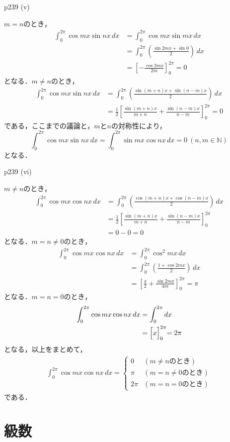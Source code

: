 \documentclass[dvipdfmx,uplatex,11pt]{jsarticle}
\theoremstyle{definition}
\begin{document}
	\begin{screen}
		p239 (v) \par 
		$m=n$のとき，
		\begin{align*}
			\int_{0}^{2\pi} \cos m x \sin nx \, dx & = \int_{0}^{2\pi} \cos mx \sin mx \, dx \\
			& = \int_{0}^{2\pi} \left (\frac{\sin 2mx + \sin 0}{2}\right ) \, dx \\
			& = \left [-\frac{\cos 2mx}{2m}\right ]_{0}^{2\pi} =0
		\end{align*}
		となる．$m \ne n$のとき，
		\begin{align*}
			\int_{0}^{2\pi} \cos mx \sin nx \, dx & = \int_{0}^{2\pi} \left (\frac{\sin (m+n)x + \sin (n-m)x}{2}\right) \, dx \\
			& = \frac{1}{2}\left [\frac{\sin (m+n)x}{m+n}+\frac{\sin (n-m)x}{n-m} \right]_{0}^{2\pi} =0
		\end{align*}
		である，ここまでの議論と，$m$と$n$の対称性により，
			\[
				\int_{0}^{2\pi} \cos mx \sin nx \, dx =\int_{0}^{2\pi} \sin mx \cos nx \, dx =0 ~(n,m \in \mathbb{N})
			\]
		となる．
	\end{screen}

	\begin{screen}
		p239 (vi) \par 
		$m \ne n$のとき，
		\begin{align*}
			\int_{0}^{2\pi} \cos mx \cos nx \, dx & = \int_{0}^{2\pi} \left (\frac{\cos(m+n)x+\cos(n-m)x}{2}\right) \, dx\\
			& = \frac{1}{2} \left [\frac{\sin (m+n)x}{m+n}+\frac{\sin(n-m)x}{n-m}\right]_{0}^{2\pi} \\
			& = 0-0 =0
		\end{align*}
		となる．$m =n \ne 0$のとき，
		\begin{align*}
			\int_{0}^{2\pi} \cos mx \cos nx \, dx & = \int_{0}^{2\pi} \cos^2 mx \, dx \\
			& = \int_{0}^{2\pi} \left (\frac{1+\cos 2mx}{2}\right) \, dx  \\
			& = \left [\frac{x}{2}+\frac{\sin 2mx}{4m}\right]_{0}^{2\pi} = \pi
		\end{align*}
		となる．$m =n =0$のとき，
		\begin{align*}
			\int_{0}^{2\pi} \cos mx \cos nx \, dx & = \int_{0}^{2\pi} dx \\
			& = \Bigl[x\Bigl]_{0}^{2\pi} = 2\pi
		\end{align*}
		となる，以上をまとめて，
		\begin{align*}
			\int_{0}^{2\pi} \cos mx \cos nx \, dx =
			\begin{cases}
				0 & (m \ne n のとき)\\
				\pi & (m = n\ne 0のとき)\\
				2 \pi & (m=n=0 のとき)
			\end{cases}
		\end{align*}
		である．
	\end{screen}

\newpage

\section{級数}
\end{document}

